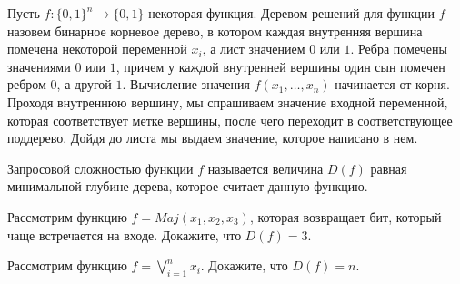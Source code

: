 


\vspace{2cm}
Пусть $f: \{0, 1\}^n \rightarrow \{0, 1\}$ некоторая функция. Деревом решений для
функции $f$ назовем бинарное корневое дерево, в котором каждая внутренняя вершина
помечена некоторой переменной $x_i$, а лист значением $0$ или $1$. Ребра помечены
значениями $0$ или $1$, причем у каждой внутренней вершины один сын помечен ребром
$0$, а другой $1$. Вычисление значения $f(x_1, \dots, x_n)$ начинается от
корня. Проходя внутреннюю вершину, мы спрашиваем значение входной переменной, которая
соответствует метке вершины, после чего переходит в соответствующее поддерево. Дойдя
до листа мы выдаем значение, которое написано в нем.


Запросовой сложностью функции $f$ называется величина $D(f)$ равная минимальной
глубине дерева, которое считает данную функцию.




\begin{task}
    Рассмотрим функцию $f = Maj(x_1, x_2, x_3)$, которая возвращает бит, который чаще
    встречается на входе. Докажите, что $D(f) = 3$.

\end{task}

\begin{task}
    Рассмотрим функцию $f = \bigvee\limits_{i = 1}^{n} x_i$. Докажите, что $D(f) = n$.
\end{task}

\breakline

